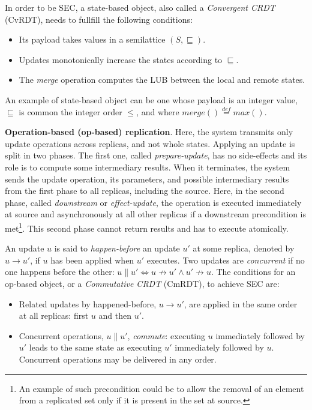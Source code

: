 In order to be SEC, a state-based object, also called a \textit{Convergent
CRDT} (CvRDT), needs to fullfill the following conditions:
\begin{itemize}
  \item Its payload takes values in a semilattice $(S,\sqsubseteq)$.
  \item Updates monotonically increase the states according to $\sqsubseteq$.
  \item The \textit{merge} operation computes the LUB between the local and
  remote states.
\end{itemize}

An example of state-based object can be one whose payload is an integer value,
$\sqsubseteq$ is common the integer order $\leq$, and where $merge()
\stackrel{def}{=} max()$.

\textbf{Operation-based (op-based) replication}. Here, the system transmits only
update operations across replicas, and not whole states. Applying an update is
split in two phases. The first one, called \textit{prepare-update}, has no
side-effects and its role is to compute some intermediary results. When it
terminates, the system sends the update operation, its parameters, and possible
intermediary results from the first phase to all replicas, including the source.
Here, in the second phase, called \textit{downstream} or \textit{effect-update},
the operation is executed immediately at source and asynchronously at all other
replicas if a downstream precondition is met\footnote{An example of such
precondition could be to allow the removal of an element from a replicated set
only if it is present in the set at source.}. This second phase cannot return
results and has to execute atomically.

An update $u$ is said to \textit{happen-before} an update $u'$ at some replica,
denoted by $u \rightarrow u'$, if $u$ has been applied when $u'$ executes. Two
updates are \textit{concurrent} if no one happens before the other: $u \parallel
u' \iff u \not\rightarrow u' \land u' \not\rightarrow u$. The conditions for an
op-based object, or a \textit{Commutative CRDT} (CmRDT), to achieve SEC are:
\begin{itemize}
  \item Related updates by happened-before, $u \rightarrow u'$, are applied in
  the same order at all replicas: first $u$ and then $u'$.
  \item Concurrent operations, $u \parallel u'$, \textit{commute}: executing $u$
  immediately followed by $u'$ leads to the same state as executing $u'$
  immediately followed by $u$. Concurrent operations may be delivered in any
  order.
\end{itemize}

